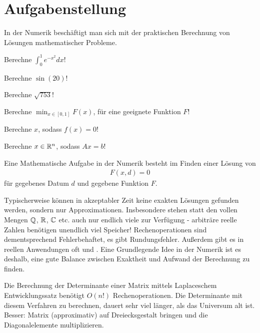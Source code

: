 \documentclass{report}
\begin{document}
	
	\tableofcontents
	\thispagestyle{fancy}
	\chapter{Aufgabenstellung}
	In der Numerik beschäftigt man sich mit der praktischen Berechnung von Lösungen mathematischer Probleme.
	\begin{example}
		Berechne $\displaystyle \int_0^1 e^{-x^2} dx$!
	\end{example}
	\begin{example}
		Berechne $\sin(20)$!
	\end{example}
	\begin{example}
		Berechne $\sqrt{753}$!
	\end{example}
	\begin{example}
		Berechne $\displaystyle \min_{x \in [0,1]} F(x)$, für eine geeignete Funktion $F$!
	\end{example}
	\begin{example}
		Berechne $x$, sodass $f(x) = 0$!
	\end{example}
	\begin{example}
		Berechne $x \in \mathbb{R}^n$, sodass $Ax = b$!
	\end{example}
	\begin{definition}
		Eine Mathematische Aufgabe in der Numerik besteht im Finden einer Lösung von
		\begin{align*}
			F(x,d) = 0
		\end{align*}
		für gegebenes Datum $d$ und gegebene Funktion $F$.
	\end{definition}
	\noindent
	Typischerweise können in akzeptabler Zeit keine exakten Lösungen gefunden werden, sondern nur Approximationen. Insbesondere stehen statt den vollen Mengen $\mathbb{Q}$, $\mathbb{R}$, $\mathbb{C}$ etc. auch nur endlich viele  zur Verfügung - arbiträre reelle Zahlen benötigen unendlich viel Speicher! Rechenoperationen sind dementsprechend Fehlerbehaftet, es gibt Rundungsfehler. Außerdem gibt es in reellen Anwendungen oft  und .
	\newpar
	Eine Grundlegende Idee in der Numerik ist es deshalb, eine gute Balance zwischen Exaktheit und Aufwand der Berechnung zu finden.
	\begin{example}
		Die Berechnung der Determinante einer Matrix mittels Laplaceschem Entwicklungssatz benötigt $O(n!)$ Rechenoperationen. Die Determinante mit diesem Verfahren zu berechnen, dauert sehr viel länger, als das Universum alt ist.
		\newpar
		Besser: Matrix (approximativ) auf Dreiecksgestalt bringen und die Diagonalelemente multiplizieren.
	\end{example}
\end{document}
